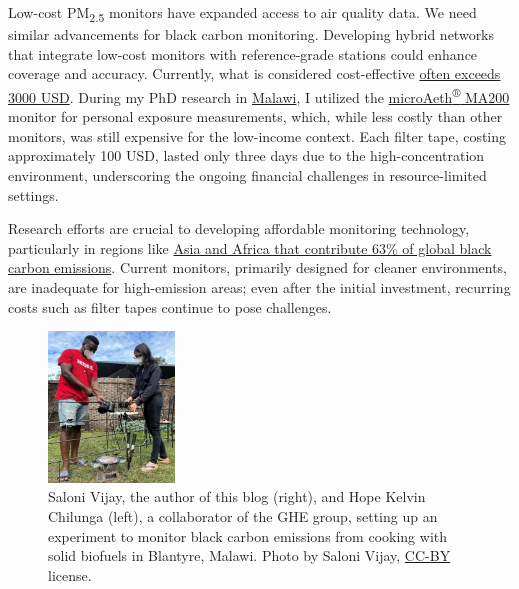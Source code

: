 \documentclass[
  letterpaper,
  DIV=11,
  numbers=noendperiod]{scrartcl}
\begin{document}
Low-cost PM\textsubscript{2.5} monitors have expanded access to air
quality data. We need similar advancements for black carbon monitoring.
Developing hybrid networks that integrate low-cost monitors with
reference-grade stations could enhance coverage and accuracy. Currently,
what is considered cost-effective
\href{https://metone.com/introducing-the-groundbreaking-c-12-portable-carbon-monitor-making-carbon-measurements-accessible-worldwide/}{often
exceeds 3000 USD}. During my PhD research in
\href{https://en.wikipedia.org/wiki/Malawi}{Malawi}, I utilized the
\href{https://aethlabs.com/microaeth/ma200/overview}{microAeth\textsuperscript{®}
MA200} monitor for personal exposure measurements, which, while less
costly than other monitors, was still expensive for the low-income
context. Each filter tape, costing approximately 100 USD, lasted only
three days due to the high-concentration environment, underscoring the
ongoing financial challenges in resource-limited settings.

Research efforts are crucial to developing affordable monitoring
technology, particularly in regions like
\href{https://www.clarity.io/blog/air-quality-measurements-series-black-carbon\#:~:text=More\%20than\%2075\%25\%20of\%20global,lack\%20comprehensive\%20air\%20quality\%20regulations.}{Asia
and Africa that contribute 63\% of global black carbon emissions}.
Current monitors, primarily designed for cleaner environments, are
inadequate for high-emission areas; even after the initial investment,
recurring costs such as filter tapes continue to pose challenges.

\begin{figure}[H]

{\centering \includegraphics[width=1.32in,height=\textheight]{img/measuring-air-quality.jpg}

}

\caption{Saloni Vijay, the author of this blog (right), and Hope Kelvin
Chilunga (left), a collaborator of the GHE group, setting up an
experiment to monitor black carbon emissions from cooking with solid
biofuels in Blantyre, Malawi. Photo by Saloni Vijay,
\href{https://creativecommons.org/licenses/by/4.0/deed.en}{CC-BY}
license.}

\end{figure}%
\end{document}
